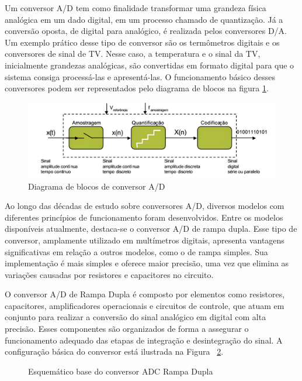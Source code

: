 Um conversor A/D tem como finalidade transformar uma grandeza física analógica em um dado digital, em um processo chamado de quantização. Já a conversão oposta, de digital para analógico, é realizada pelos conversores D/A. Um exemplo prático desse tipo de conversor são os termômetros digitais e os conversores de sinal de TV. Nesse caso, a temperatura e o sinal da TV, inicialmente grandezas analógicas, são convertidas em formato digital para que o sistema consiga processá-las e apresentá-las. O funcionamento básico desses conversores podem ser representados pelo diagrama de blocos na figura \ref{fig:diagrama-conversor}.

\begin{figure}
    \centering
    \includegraphics[width=1\linewidth]{conversorAD.png}
    \caption{Diagrama de blocos de conversor A/D}
    \label{fig:diagrama-conversor}
\end{figure}

Ao longo das décadas de estudo sobre conversores A/D, diversos modelos com diferentes princípios de funcionamento foram desenvolvidos. Entre os modelos disponíveis atualmente, destaca-se o conversor A/D de rampa dupla. Esse tipo de conversor, amplamente utilizado em multímetros digitais, apresenta vantagens significativas em relação a outros modelos, como o de rampa simples. Sua implementação é mais simples e oferece maior precisão, uma vez que elimina as variações causadas por resistores e capacitores no circuito.

O conversor A/D de Rampa Dupla é composto por elementos como resistores, capacitores, amplificadores operacionais e circuitos de controle, que atuam em conjunto para realizar a conversão do sinal analógico em digital com alta precisão. Esses componentes são organizados de forma a assegurar o funcionamento adequado das etapas de integração e desintegração do sinal. A configuração básica do conversor está ilustrada na Figura ~\ref{fig:basic_dual_slope_schematic}.

\begin{figure}[H]
    \centering
    
    \caption{Esquemático base do conversor ADC Rampa Dupla}
    \label{fig:basic_dual_slope_schematic}
\end{figure}



